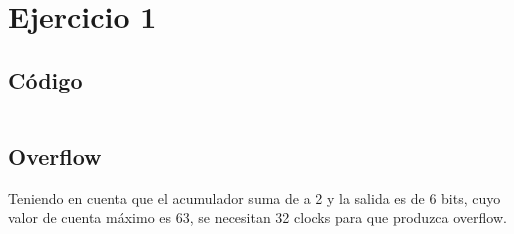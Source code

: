 \section{Ejercicio 1}
\subsection{Código}
\inputminted[fontsize=\footnotesize]{systemverilog}{../sum_accumulator/rtl/sum_accumulator.sv}

\subsection{Overflow}
Teniendo en cuenta que el acumulador suma de a 2 y la salida es de 6 bits, cuyo valor de cuenta máximo es 63, se necesitan 32 clocks para que produzca overflow.

